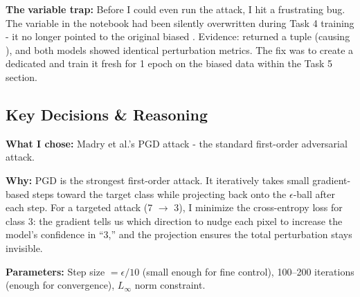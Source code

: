 \documentclass[9pt,a4paper,twocolumn,twoside]{tau-class/tau}
\begin{document}
        \begin{note}
            \textbf{The}  \textbf{variable trap:} Before I could even run the attack, I hit a frustrating bug. The  variable in the notebook had been silently overwritten during Task 4 training - it no longer pointed to the original biased . Evidence:  returned a tuple (causing ), and both models showed identical perturbation metrics. The fix was to create a dedicated  and train it fresh for 1 epoch on the biased data within the Task 5 section.
        \end{note}

    \subsection{Key Decisions \& Reasoning}

        \begin{tauenv}[frametitle={Decision: PGD (Projected Gradient Descent) as the Attack Method}]
            \textbf{What I chose:} Madry et al.'s PGD attack \cite{madry2018towards} - the standard first-order adversarial attack.

            \textbf{Why:} PGD is the strongest first-order attack. It iteratively takes small gradient-based steps toward the target class while projecting back onto the $\epsilon$-ball after each step. For a targeted attack (7 $\rightarrow$ 3), I minimize the cross-entropy loss for class 3: the gradient tells us which direction to nudge each pixel to increase the model's confidence in ``3,'' and the projection ensures the total perturbation stays invisible.

            \textbf{Parameters:} Step size $= \epsilon / 10$ (small enough for fine control), 100--200 iterations (enough for convergence), $L_\infty$ norm constraint.
        \end{tauenv}
\end{document}

